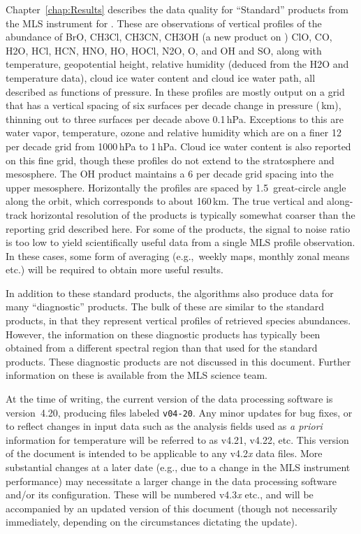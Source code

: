 \documentclass[11pt,draft]{report}
\begin{document}
Chapter~\ref{chap:Results} describes the data quality for ``Standard''
products from the MLS instrument for \thisv.  These are observations of
vertical profiles of the abundance of BrO, CH\cs3Cl, CH\cs3CN, CH\cs3OH
(a new product on \thisv) ClO, CO, H\cs2O, HCl, HCN, HNO, HO,
HOCl, N\cs2O, O, and OH and SO, along with temperature,
geopotential height, relative humidity (deduced from the H\cs2O and
temperature data), cloud ice water content and cloud ice water path, all
described as functions of pressure.  In \thisv these profiles are mostly
output on a grid that has a vertical spacing of six surfaces per decade
change in pressure (\,km), thinning out to three
surfaces per decade above 0.1\,hPa.  Exceptions to this are water vapor,
temperature, ozone and relative humidity which are on a finer 12 per
decade grid from 1000\,hPa to 1\,hPa.  Cloud ice water content is also
reported on this fine grid, though these profiles do not extend to the
stratosphere and mesosphere.  The OH product maintains a 6 per decade
grid spacing into the upper mesosphere.  Horizontally the profiles are
spaced by 1.5\degsym\ great-circle angle along the orbit, which
corresponds to about 160\,km.  The true vertical and along-track
horizontal resolution of the products is typically somewhat coarser than
the reporting grid described here.  For some of the products, the signal
to noise ratio is too low to yield scientifically useful data from a
single MLS profile observation.  In these cases, some form of averaging
(e.g.,\ weekly maps, monthly zonal means etc.) will be required to
obtain more useful results.

In addition to these standard products, the algorithms also produce data
for many ``diagnostic'' products.  The bulk of these are similar to the
standard products, in that they represent vertical profiles of retrieved
species abundances.  However, the information on these diagnostic
products has typically been obtained from a different spectral region
than that used for the standard products.  These diagnostic products are
not discussed in this document.  Further information on these is
available from the MLS science team.

At the time of writing, the current version of the data processing
software is version~4.20, producing files labeled \texttt{v04-20}.  Any
minor updates for bug fixes, or to reflect changes in input data such as
the analysis fields used as \emph{a priori} information for temperature
will be referred to as v4.21, v4.22, etc.  This version of the document
is intended to be applicable to any v4.2\emph{x} data files.  More
substantial changes at a later date (e.g., due to a change in the MLS
instrument performance) may necessitate a larger change in the data
processing software and/or its configuration.  These will be numbered
v4.3\emph{x} etc., and will be accompanied by an updated version of this
document (though not necessarily immediately, depending on the
circumstances dictating the update).
\end{document}
